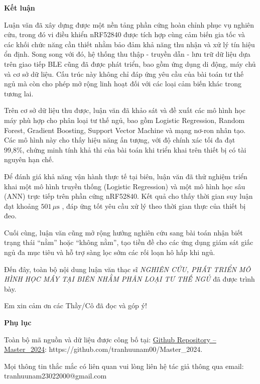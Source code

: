 
\begin{center}
  \textbf{\fontsize{20}{22}\selectfont Kết luận}
\end{center}

Luận văn đã xây dựng được một nền tảng phần cứng hoàn chỉnh phục vụ nghiên cứu,
trong đó vi điều khiển nRF52840 được tích hợp cùng cảm biến gia tốc và các khối
chức năng cần thiết nhằm bảo đảm khả năng thu nhận và xử lý tín hiệu ổn định.
Song song với đó, hệ thống thu thập - truyền dẫn - lưu trữ dữ liệu dựa trên
giao tiếp BLE cũng đã được phát triển, bao gồm ứng dụng di động, máy chủ và cơ
sở dữ liệu. Cấu trúc này không chỉ đáp ứng yêu cầu của bài toán tư thế ngủ mà
còn cho phép mở rộng linh hoạt đối với các loại cảm biến khác trong tương lai.

Trên cơ sở dữ liệu thu được, luận văn đã khảo sát và đề xuất các mô hình học
máy phù hợp cho phân loại tư thế ngủ, bao gồm Logistic Regression, Random
Forest, Gradient Boosting, Support Vector Machine và mạng nơ-ron nhân tạo. Các
mô hình này cho thấy hiệu năng ấn tượng, với độ chính xác tối đa đạt 99,8\%,
chứng minh tính khả thi của bài toán khi triển khai trên thiết bị có tài nguyên
hạn chế.

Để đánh giá khả năng vận hành thực tế tại biên, luận văn đã thử nghiệm triển khai một mô hình truyền thống (Logistic Regression) và một mô hình học sâu (ANN) trực tiếp trên phần cứng nRF52840.
Kết quả cho thấy thời gian suy luận đạt khoảng  $501\,\mu\text{s}$
, đáp ứng tốt yêu cầu xử lý theo thời gian thực của thiết bị đeo.

Cuối cùng, luận văn cũng mở rộng hướng nghiên cứu sang bài toán nhận biết trạng
thái “nằm” hoặc “không nằm”, tạo tiền đề cho các ứng dụng giám sát giấc ngủ đa
mục tiêu và hỗ trợ sàng lọc sớm các rối loạn hô hấp khi ngủ.

Đến đây, toàn bộ nội dung luận văn thạc sĩ \textit{NGHIÊN CỨU, PHÁT TRIỂN MÔ HÌNH HỌC
  MÁY TẠI BIÊN NHẰM PHÂN LOẠI TƯ THẾ
  NGỦ} đã được trình bày.

Em xin cảm ơn các Thầy/Cô đã đọc và góp ý!

\begin{center}
  \textbf{\fontsize{20}{22}\selectfont Phụ lục}
\end{center}

Toàn bộ mã nguồn và dữ liệu được công bố tại:
\href{https://github.com/tranhuunam00/Master_2024}{Github Repository –
  Master\_2024}: https://github.com/tranhuunam00/Master\_2024.

Mọi thông tin thắc mắc có liên quan vui lòng liên hệ tác giả thông qua email:
tranhuunam23022000@gmail.com
